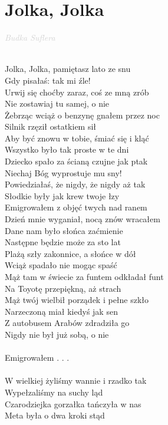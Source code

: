\documentclass[a5paper, 10pt]{book}
\begin{document}
\section{Jolka, Jolka}\textcolor{lightgray}{\textit{Budka Suflera}}\\~\\
\begin{minipage}[t]{0.6\textwidth}
  Jolka, Jolka, pamiętasz lato ze snu\\
  Gdy pisałaś: tak mi źle!\\
  Urwij się choćby zaraz, coś ze mną zrób\\
  Nie zostawiaj tu samej, o nie\\

  Żebrząc wciąż o benzynę gnałem przez noc\\
  Silnik rzęził ostatkiem sił\\
  Aby być znowu w tobie, śmiać się i kląć\\
  Wszystko było tak proste w te dni\\

  Dziecko spało za ścianą czujne jak ptak\\
  Niechaj Bóg wyprostuje mu sny!\\
  Powiedziałaś, że nigdy, że nigdy aż tak\\
  Słodkie były jak krew twoje łzy\\

  \hspace*{6mm}Emigrowałem z objęć twych nad ranem\\
  \hspace*{6mm}Dzień mnie wyganiał, nocą znów wracałem\\
  \hspace*{6mm}Dane nam było słońca zaćmienie\\
  \hspace*{6mm}Następne będzie może za sto lat\\

  Plażą szły zakonnice, a słońce w dół\\
  Wciąż spadało nie mogąc spaść\\
  Mąż tam w świecie za funtem odkładał funt\\
  Na Toyotę przepiękną, aż strach\\

  Mąż twój wielbił porządek i pełne szkło\\
  Narzeczoną miał kiedyś jak sen\\
  Z autobusem Arabów zdradziła go\\
  Nigdy nie był już sobą, o nie\\
  \\
  \hspace*{6mm}Emigrowałem . . .\\
  \\
  W wielkiej żyliśmy wannie i rzadko tak\\
  Wypełzaliśmy na suchy ląd\\
  Czarodziejka gorzałka tańczyła w nas\\
  Meta była o dwa kroki stąd\\


\end{minipage}
\end{document}
